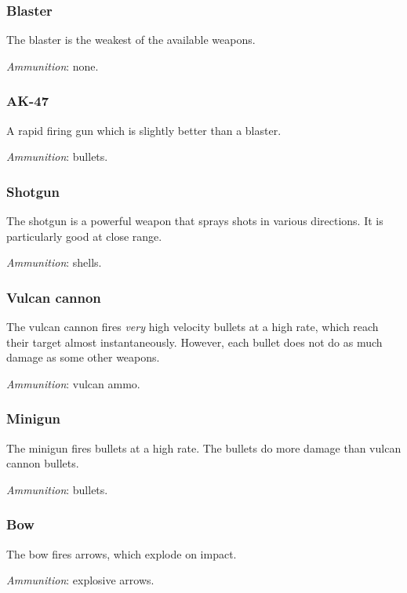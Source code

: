 \documentclass[a4paper,titlepage]{article}
\begin{document}
\subsubsection*{Blaster}

The blaster is the weakest of the available weapons.

\noindent
\emph{Ammunition}: none.

\subsubsection*{AK-47}

A rapid firing gun which is slightly better than a blaster.

\noindent
\emph{Ammunition}: bullets.

\subsubsection*{Shotgun}

The shotgun is a powerful weapon that sprays shots in various
directions.  It is particularly good at close range.

\noindent
\emph{Ammunition}: shells.

\subsubsection*{Vulcan cannon}

The vulcan cannon fires \emph{very} high velocity bullets at a high
rate, which reach their target almost instantaneously.  However, each
bullet does not do as much damage as some other weapons.

\noindent
\emph{Ammunition}: vulcan ammo.

\subsubsection*{Minigun}

The minigun fires bullets at a high rate.  The bullets do more damage
than vulcan cannon bullets.

\noindent
\emph{Ammunition}: bullets.

\subsubsection*{Bow}

The bow fires arrows, which explode on impact.

\noindent
\emph{Ammunition}: explosive arrows.
\end{document}
